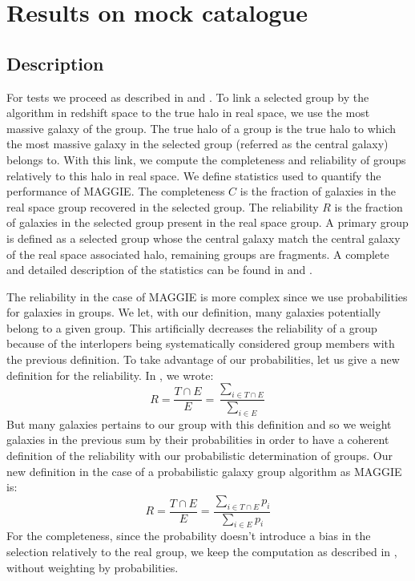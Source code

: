 \section{Results on mock catalogue}
\label{sec:results_on_mock_catalogue}

\subsection{Description}
\label{sub:maggie_tests_description}

For tests we proceed as described in \citet{Yang+07, Duarte+14} and
. To link a selected group by the
algorithm in redshift space to the true halo in real space, we use the most
massive galaxy of the group. The true halo of a group is the true halo to which
the most massive galaxy in the selected group (referred as the central galaxy)
belongs to. With this link, we compute the completeness and reliability of
groups relatively to this halo in real space. We define statistics used to
quantify the performance of MAGGIE\@. The completeness $C$ is the fraction of
galaxies in the real space group recovered in the selected group. The
reliability $R$ is the fraction of galaxies in the selected group present in
the real space group. A primary group is defined as a selected group whose the
central galaxy match the central galaxy of the real space associated halo,
remaining groups are fragments. A complete and detailed description of the
statistics can be found in \citet{Duarte+14} and
.

The reliability in the case of MAGGIE is more complex since we use
probabilities for galaxies in groups. We let, with our definition, many
galaxies potentially belong to a given group. This artificially decreases
the reliability of a group because of the interlopers being systematically
considered group members with the previous definition. To take advantage of
our probabilities, let us give a new definition for the reliability. In
\citet{Duarte+14}, we wrote:
%
\begin{equation}
    R=\frac{T \cap E}{E}=\frac{\sum_{i\in T\cap E}}{\sum_{i\in E}}
\end{equation}
%
But many galaxies pertains to our group with this definition and so we
weight galaxies in the previous sum by their probabilities in order to have
a coherent definition of the reliability with our probabilistic
determination of groups. Our new definition in the case of a probabilistic
galaxy group algorithm as MAGGIE is:
%
\begin{equation}
    R=\frac{T \cap E}{E}=\frac{\sum_{i\in T\cap E} p_i}{\sum_{i\in E}p_i}
\end{equation}
%
For the completeness, since the probability doesn't introduce a bias in the
selection relatively to the real group, we keep the computation as described
in \citet{Duarte+14}, without weighting by probabilities.

